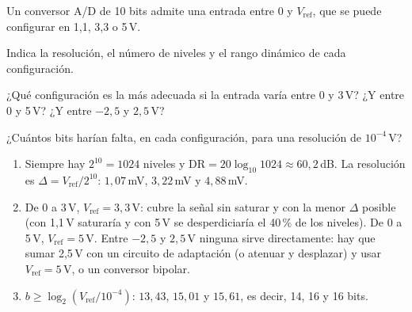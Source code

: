 \documentclass[11pt,a4paper]{scrartcl}
\begin{document}
\begin{ejercicio}
  Un conversor A/D de 10 bits admite una entrada entre 0 y $V_{\text{ref}}$, que se puede configurar en 1,1, 3,3 o 5\,V.
  \begin{incisos}[1]
    \item Indica la resolución, el número de niveles y el rango dinámico de cada configuración.
    \item ¿Qué configuración es la más adecuada si la entrada varía entre 0 y 3\,V? ¿Y entre 0 y 5\,V? ¿Y entre $-2{,}5$ y $2{,}5$\,V?
    \item ¿Cuántos bits harían falta, en cada configuración, para una resolución de $10^{-4}$\,V?
  \end{incisos}
\end{ejercicio}
\begin{solucion}
  \begin{enumerate}[label=\alph*)]
    \item Siempre hay $2^{10}=1024$ niveles y $\mathrm{DR}=20\log_{10}1024\approx60{,}2$\,dB. La resolución es $\Delta=V_{\text{ref}}/2^{10}$: $1{,}07$\,mV, $3{,}22$\,mV y $4{,}88$\,mV.
    \item De 0 a 3\,V, $V_{\text{ref}}=3{,}3$\,V: cubre la señal sin saturar y con la menor $\Delta$ posible (con 1,1\,V saturaría y con 5\,V se desperdiciaría el 40\,\% de los niveles). De 0 a 5\,V, $V_{\text{ref}}=5$\,V. Entre $-2{,}5$ y $2{,}5$\,V ninguna sirve directamente: hay que sumar 2,5\,V con un circuito de adaptación (o atenuar y desplazar) y usar $V_{\text{ref}}=5$\,V, o un conversor bipolar.
    \item $b\ge\log_2(V_{\text{ref}}/10^{-4})$: $13{,}43$, $15{,}01$ y $15{,}61$, es decir, 14, 16 y 16 bits.
  \end{enumerate}
\end{solucion}
\end{document}
